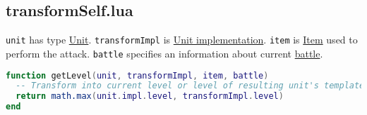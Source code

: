 \subsection{transformSelf.lua}
\texttt{unit} has type \hyperref[Unit]{Unit}. \texttt{transformImpl} is \hyperref[UnitImpl]{Unit implementation}. \texttt{item} is \hyperref[Item]{Item} used to perform the attack. \texttt{battle} specifies an information about current \hyperref[Battle]{battle}.
\begin{center}
\begin{lstlisting}[language=Lua]
function getLevel(unit, transformImpl, item, battle)
  -- Transform into current level or level of resulting unit's template, whichever is bigger.
  return math.max(unit.impl.level, transformImpl.level)
end
\end{lstlisting}
\end{center}